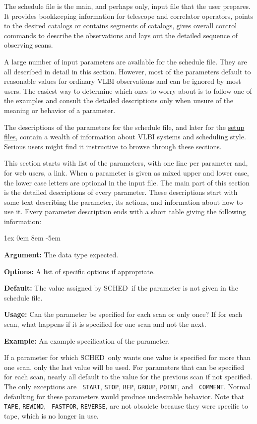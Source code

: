 \documentclass{report}
\newcommand{\schedb}{{\sc SCHED~}}
\newcommand{\rcwbox}[5]{
  \begin{list}{}{\parsep 1ex  \itemsep 0em
                 \leftmargin 8em  \itemindent -5em }
    \item {\bf Argument:} #1
    \item {\bf Options:}  #2
    \item {\bf Default:}  #3
    \item {\bf Usage:}    #4
    \item {\bf Example:}  #5
  \end{list}
}
\begin{document}
The schedule file is the main, and perhaps only, input file that the
user prepares.  It provides bookkeeping information for telescope
and correlator operators, points to the desired catalogs or contains
segments of catalogs, gives overall control commands to describe
the observations and lays out the detailed sequence of observing
scans.

A large number of input parameters are available for the schedule
file.  They are all described in detail in this section.  However,
most of the parameters default to reasonable values for ordinary
VLBI observations and can be ignored by most users.  The easiest
way to determine which ones to worry about is to follow one of
the examples and consult the detailed descriptions only when unsure
of the meaning or behavior of a parameter.

The descriptions of the parameters for the schedule file, and later
for the 
{\hyperref[SEC:SETUPS]{setup files}}, contain a wealth of
information about VLBI systems and scheduling style.  Serious users
might find it instructive to browse through these sections.

This section starts with list of the parameters, with one line
per parameter and, for web users, a link.  When a parameter is
given as mixed upper and lower case, the lower case letters are
optional in the input file.  The main part of this section is
the detailed descriptions of every parameter.  These descriptions
start with some text describing the parameter, its actions, and
information about how to use it.  Every parameter description
ends with a short table giving the following information:

\rcwbox
{The data type expected.}
{A list of specific options if appropriate.}
{The value assigned by \schedb if the parameter is not given in the
schedule file.}
{Can the parameter be specified for each scan or only once? If for
each scan, what happens if it is specified for one scan and not the
next.}
{An example specification of the parameter.}

If a parameter for which \schedb only wants one value is specified for
more than one scan, only the last value will be used. For parameters
that can be specified for each scan, nearly all default to the value
for the previous scan if not specified.  The only exceptions are {\tt
START}, {\tt STOP}, {\tt REP}, {\tt GROUP}, {\tt POINT}, and {\tt
COMMENT}.  Normal defaulting for these parameters would produce
undesirable behavior.  Note that {\tt TAPE}, {\tt REWIND}, {\tt
FASTFOR}, {\tt REVERSE}, are not obsolete because they were specific
to tape, which is no longer in use.
\end{document}
